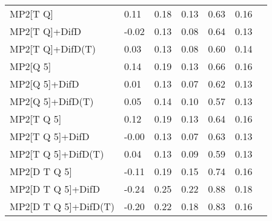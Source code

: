 \begin{table}
\begin{tabular}{l l l l l l l }
    MP2[T Q] & 0.11 & 0.18 & 0.13 & 0.63 & 0.16 \\ 
    MP2[T Q]+DifD & -0.02 & 0.13 & 0.08 & 0.64 & 0.13 \\ 
    MP2[T Q]+DifD(T) & 0.03 & 0.13 & 0.08 & 0.60 & 0.14 \\ 
    MP2[Q 5] & 0.14 & 0.19 & 0.13 & 0.66 & 0.16 \\ 
    MP2[Q 5]+DifD & 0.01 & 0.13 & 0.07 & 0.62 & 0.13 \\ 
    MP2[Q 5]+DifD(T) & 0.05 & 0.14 & 0.10 & 0.57 & 0.13 \\ 
    MP2[T Q 5] & 0.12 & 0.19 & 0.13 & 0.64 & 0.16 \\ 
    MP2[T Q 5]+DifD & -0.00 & 0.13 & 0.07 & 0.63 & 0.13 \\ 
    MP2[T Q 5]+DifD(T) & 0.04 & 0.13 & 0.09 & 0.59 & 0.13 \\ 
    MP2[D T Q 5] & -0.11 & 0.19 & 0.15 & 0.74 & 0.16 \\ 
    MP2[D T Q 5]+DifD & -0.24 & 0.25 & 0.22 & 0.88 & 0.18 \\ 
    MP2[D T Q 5]+DifD(T) & -0.20 & 0.22 & 0.18 & 0.83 & 0.16 \\ 
    \bottomrule
  \end{tabular}
\end{table}
